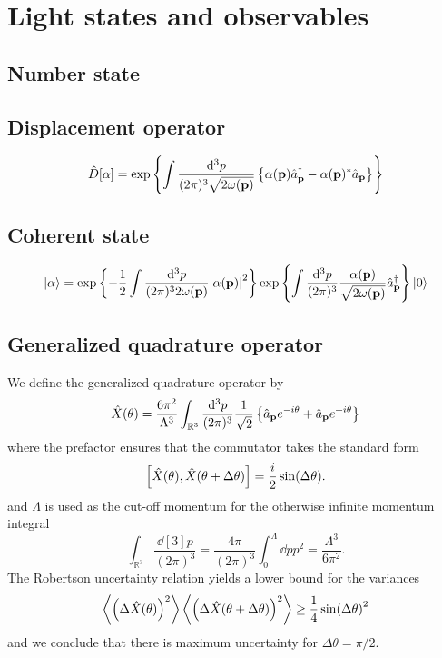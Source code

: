 \section{Light states and observables}

\subsection{Number state}

\subsection{Displacement operator}

\begin{equation}
	\hat{D}[\alpha]
	=
	\exp\left\{
		\int\frac{\dd[3]{p}}{(2\pi)^3\sqrt{2\omega(\vb{p})}}
		\left\{
			\alpha(\vb{p})
			\hat{a}_{\vb{p}}^\dagger
			-
			\alpha(\vb{p})^*
			\hat{a}_{\vb{p}}
		\right\}
	\right\}
\end{equation}

\subsection{Coherent state}

\begin{equation}
	\ket{\alpha}
	=
	\exp\left\{
		-
		\frac{1}{2}
		\int\frac{\dd[3]{p}}{(2\pi)^32\omega(\vb{p})}
		\abs{\alpha(\vb{p})}^2
	\right\}
	\exp\left\{
		\int\frac{\dd[3]{p}}{(2\pi)^3}
		\frac{\alpha(\vb{p})}{\sqrt{2\omega(\vb{p})}}
		\hat{a}_{\vb{p}}^\dagger
	\right\}
	\ket{0}
\end{equation}

\subsection{Generalized quadrature operator}

We define the generalized quadrature operator by 
\begin{equation}
	\hat{X}(\theta)
	=
	\frac{6\pi^2}{\Lambda^3}
	\int_{\mathbb{R}^3}
	\frac{\dd[3]{p}}{(2\pi)^3}
	\frac{1}{\sqrt{2}}
	\left\{
		\hat{a}_{\vb{p}}
		e^{-i\theta}
		+
		\hat{a}_{\vb{p}}
		e^{+i\theta}
	\right\}
\end{equation}
where the prefactor ensures that the commutator takes the standard form
\begin{equation}
	\comm{\hat{X}(\theta)}{\hat{X}(\theta+\Delta\theta)}
	=
	\frac{i}{2}
	\sin(\Delta\theta)
	.
\end{equation}
and $\Lambda$ is used as the cut-off momentum for the otherwise infinite momentum integral
\begin{equation}
	\int_{\mathbb{R}^3}\frac{\dd[3]{p}}{(2\pi)^3}
	=
	\frac{4\pi}{(2\pi)^3}
	\int_0^\Lambda\dd{p}p^2
	=
	\frac{\Lambda^3}{6\pi^2}
	.
\end{equation}
The Robertson uncertainty relation yields a lower bound for the variances
\begin{equation}
	\expval{\left(\Delta\hat{X}(\theta)\right)^2}
	\expval{\left(\Delta\hat{X}(\theta+\Delta\theta)\right)^2}
	\geq
	\frac{1}{4}
	\sin(\Delta\theta)^2
\end{equation}
and we conclude that there is maximum uncertainty for $\Delta\theta=\pi/2$.


